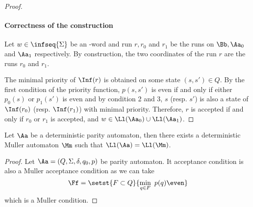 \begin{proof}
    \paragraph*{Correctness of the construction}
    Let $w \in \infseq{\Sigma}$ be an \w-word and run $r, r_0$ and $r_1$
    be the runs on $\Bb, \Aa_0$ and $\Aa_1$ respectively.
    By construction, the two coordinates of the run $r$ are the runs $r_0$ and $r_1$.

    The minimal priority of $\Inf(r)$ is obtained
    on some state $(s, s') \in Q$. By the first condition
    of the priority function, $p(s, s')$ is even if and only if
    either $p_0(s)$ or $p_1(s')$ is even
    and by condition 2 and 3, $s$ (resp. $s'$) is also
    a state of $\Inf(r_0)$ (resp. $\Inf(r_1)$) with minimal priority.
    Therefore, $r$ is accepted if and only if $r_0$ or $r_1$ is accepted,
    and $w \in \Ll(\Aa_0) \cup \Ll(\Aa_1)$.

\end{proof}


\begin{lemma}
    Let $\Aa$ be a deterministic parity automaton,
    then there exists a deterministic Muller automaton $\Mm$
    such that $\Ll(\Aa) = \Ll(\Mm)$.
\end{lemma}
\begin{proof}
    Let $\Aa = (Q, \Sigma, \delta, q_0, p)$ be parity automaton.
    It acceptance condition is also a Muller acceptance condition as we can take
    \[
        \Ff = \setst{F \subset Q}{\min_{q \in F} ~p(q) \even}
    \]
    which is a Muller condition.
\end{proof}


